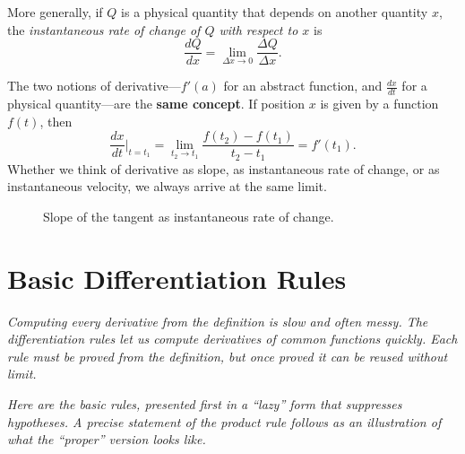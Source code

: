 \begin{definition}
\label{def:3-5}
More generally, if $Q$ is a physical quantity that depends on another quantity $x$, the \emph{instantaneous rate of change of $Q$ with respect to $x$} is
\[
  \dfrac{dQ}{dx} = \lim_{\Delta x \to 0} \dfrac{\Delta Q}{\Delta x}.
\]
\end{definition}

\begin{remark}
The two notions of derivative---$f'(a)$ for an abstract function, and $\frac{dx}{dt}$ for a physical quantity---are the \textbf{same concept}.  If position $x$ is given by a function $f(t)$, then
\[
  \dfrac{dx}{dt}\bigg|_{t = t_{1}}
  = \lim_{t_{2} \to t_{1}} \dfrac{f(t_{2}) - f(t_{1})}{t_{2} - t_{1}}
  = f'(t_{1}).
\]
Whether we think of derivative as slope, as instantaneous rate of change, or as instantaneous velocity, we always arrive at the same limit.
\end{remark}

\begin{figure}[ht]
  \centering
  
  \caption{Slope of the tangent as instantaneous rate of change.}
  \label{fig:rate-of-change}
\end{figure}

\section{Basic Differentiation Rules}
\label{sec:3.4}

\textit{Computing every derivative from the definition is slow and often messy.  The differentiation rules let us compute derivatives of common functions quickly.  Each rule must be proved from the definition, but once proved it can be reused without limit.}

\textit{Here are the basic rules, presented first in a ``lazy'' form that suppresses hypotheses.  A precise statement of the product rule follows as an illustration of what the ``proper'' version looks like.}


